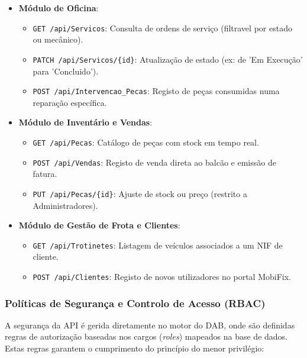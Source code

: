 \documentclass[a4paper,12pt]{scrreprt}
\begin{document}
\begin{itemize}
    \item \textbf{Módulo de Oficina}:
        \begin{itemize}
            \item \texttt{GET /api/Servicos}: Consulta de ordens de serviço (filtravel por estado ou mecânico).
            \item \texttt{PATCH /api/Servicos/\{id\}}: Atualização de estado (ex: de 'Em Execução' para 'Concluido').
            \item \texttt{POST /api/Intervencao\_Pecas}: Registo de peças consumidas numa reparação específica.
        \end{itemize}
    \item \textbf{Módulo de Inventário e Vendas}:
        \begin{itemize}
            \item \texttt{GET /api/Pecas}: Catálogo de peças com stock em tempo real.
            \item \texttt{POST /api/Vendas}: Registo de venda direta ao balcão e emissão de fatura.
            \item \texttt{PUT /api/Pecas/\{id\}}: Ajuste de stock ou preço (restrito a Administradores).
        \end{itemize}
    \item \textbf{Módulo de Gestão de Frota e Clientes}:
        \begin{itemize}
            \item \texttt{GET /api/Trotinetes}: Listagem de veículos associados a um NIF de cliente.
            \item \texttt{POST /api/Clientes}: Registo de novos utilizadores no portal MobiFix.
        \end{itemize}
\end{itemize}

\subsubsection{Políticas de Segurança e Controlo de Acesso (RBAC)}
A segurança da API é gerida diretamente no motor do DAB, onde são definidas regras de autorização baseadas nos cargos (\textit{roles}) mapeados na base de dados. Estas regras garantem o cumprimento do princípio do menor privilégio:
\end{document}
